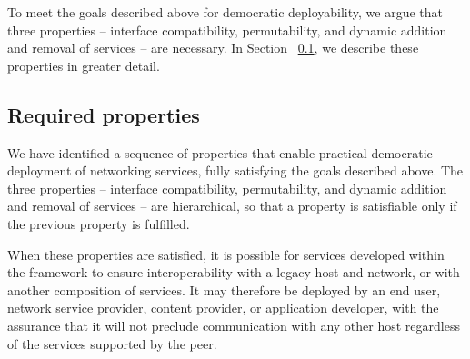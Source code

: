To meet the goals described above
for democratic deployability, we
argue that three properties -- interface compatibility,
permutability, and dynamic addition and removal of services -- are necessary. 
In Section ~\ref{subsec-goals-properties},
we describe these properties in greater detail.


\subsection{Required properties}
\label{subsec-goals-properties}

We have identified a sequence of 
properties that enable
practical democratic deployment of networking 
services, fully satisfying the goals described above.
The three 
properties -- interface compatibility,
permutability, and dynamic addition and removal of services -- 
are hierarchical,
so that a property is satisfiable only if the previous
property is fulfilled. 


When these properties are satisfied, it is possible 
for services developed within the framework 
to ensure interoperability with a legacy host and 
network, or with another composition of services.
It may therefore be deployed by an end user, 
network service provider, content provider, 
or application developer, 
with the assurance that it will not preclude communication 
with any other host regardless of the services 
supported by the peer. 






